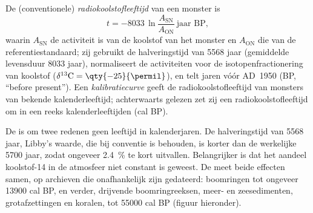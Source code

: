 \begin{definition}\label{def:b1:radiometric-methods:radiocarbon}
De (conventionele) \emph{radiokoolstofleeftijd} van een monster is
\[
  t = -8033 \,\ln \frac{A_{\mathrm{SN}}}{A_{\mathrm{ON}}} \ \text{jaar BP},
\]
waarin $A_{\mathrm{SN}}$ de activiteit is van de koolstof van het monster en $A_{\mathrm{ON}}$ die van de referentiestandaard; zij gebruikt de halveringstijd van \num{5568} jaar (gemiddelde levensduur \num{8033} jaar), normaliseert de activiteiten voor de isotopenfractionering van koolstof ($\delta^{13}\mathrm{C} = \qty{-25}{\permil}$), en telt jaren vóór AD~1950 (BP, ``before present''). Een \emph{kalibratiecurve} geeft de radiokoolstofleeftijd van monsters van bekende kalenderleeftijd; achterwaarts gelezen zet zij een radiokoolstofleeftijd om in een reeks kalenderleeftijden (cal BP).
\end{definition}

De  is om twee redenen geen leeftijd in kalenderjaren. De halveringstijd van \num{5568} jaar, Libby's waarde, die bij conventie is behouden, is korter dan de werkelijke \num{5700} jaar, zodat  ongeveer \qty{2.4}{\percent} te kort uitvallen. Belangrijker is dat het aandeel koolstof-14 in de atmosfeer niet constant is geweest. De  meet beide effecten samen, op archieven die onafhankelijk zijn gedateerd: boomringen tot ongeveer \num{13900} cal BP, en verder, drijvende boomringreeksen, meer- en zeesedimenten, grotafzettingen en koralen, tot \num{55000} cal BP (figuur hieronder).

